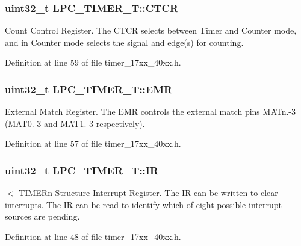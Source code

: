 \subsubsection[{\texorpdfstring{C\+T\+CR}{CTCR}}]{ uint32\+\_\+t L\+P\+C\+\_\+\+T\+I\+M\+E\+R\+\_\+\+T\+::\+C\+T\+CR}\hypertarget{structLPC__TIMER__T_a8bee15636f5bce5c6d3f3fcd4d8cf513}{}\label{structLPC__TIMER__T_a8bee15636f5bce5c6d3f3fcd4d8cf513}
Count Control Register. The C\+T\+CR selects between Timer and Counter mode, and in Counter mode selects the signal and edge(s) for counting. 

Definition at line 59 of file timer\+\_\+17xx\+\_\+40xx.\+h.

\subsubsection[{\texorpdfstring{E\+MR}{EMR}}]{ uint32\+\_\+t L\+P\+C\+\_\+\+T\+I\+M\+E\+R\+\_\+\+T\+::\+E\+MR}\hypertarget{structLPC__TIMER__T_a92df4dc0b947774e8cf040b5c2c2ae30}{}\label{structLPC__TIMER__T_a92df4dc0b947774e8cf040b5c2c2ae30}
External Match Register. The E\+MR controls the external match pins M\+A\+Tn.-\/3 (M\+A\+T0.-\/3 and M\+A\+T1.-\/3 respectively). 

Definition at line 57 of file timer\+\_\+17xx\+\_\+40xx.\+h.

\subsubsection[{\texorpdfstring{IR}{IR}}]{ uint32\+\_\+t L\+P\+C\+\_\+\+T\+I\+M\+E\+R\+\_\+\+T\+::\+IR}\hypertarget{structLPC__TIMER__T_a3db61fe5ab56aeea0c27c6199da63b1a}{}\label{structLPC__TIMER__T_a3db61fe5ab56aeea0c27c6199da63b1a}
$<$ T\+I\+M\+E\+Rn Structure Interrupt Register. The IR can be written to clear interrupts. The IR can be read to identify which of eight possible interrupt sources are pending. 

Definition at line 48 of file timer\+\_\+17xx\+\_\+40xx.\+h.

